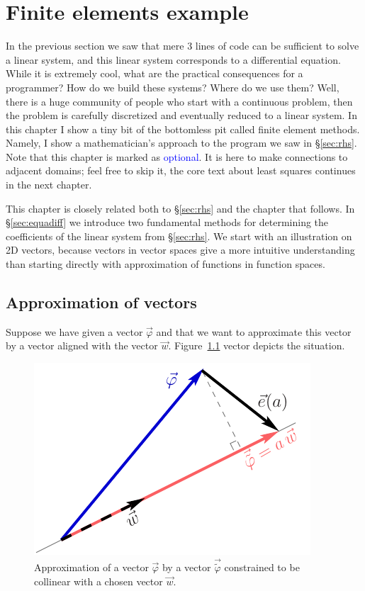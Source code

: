 \documentclass[notitlepage,oneside]{book}
\makeatletter
\newcommand{\authoredby}[1]{\addtocontents{toc}{\protect\@nameuse{authoredby#1}}}%
\makeatother
\begin{document}


\authoredby{A}
\chapter{Finite elements example}
\fancyhead[R]{\textcolor{blue}{optional for reading}}

In the previous section we saw that mere 3 lines of code can be sufficient to solve a linear system, and this linear system corresponds to a differential equation.
While it is extremely cool, what are the practical consequences for a programmer?  How do we build these systems? Where do we use them?
Well, there is a huge community of people who start with a continuous problem, then the problem is carefully discretized and eventually reduced to a linear system.
In this chapter I show a tiny bit of the bottomless pit called finite element methods.
Namely, I show a mathematician's approach to the program we saw in \S\ref{sec:rhs}.
Note that this chapter is marked as \textcolor{blue}{optional}.
It is here to make connections to adjacent domains; feel free to skip it, the core text about least squares continues in the next chapter.

This chapter is closely related both to \S\ref{sec:rhs} and the chapter that follows.
In \S\ref{sec:equadiff} we introduce two fundamental methods for determining the coefficients of the linear system from \S\ref{sec:rhs}.
We start with an illustration on 2D vectors, because vectors in vector spaces give a more intuitive understanding than starting directly with approximation of functions in function spaces.

\section{Approximation of vectors}

Suppose we have given a vector $\vec{\varphi}$ and that we want to approximate this vector by a vector aligned with the vector $\vec{w}$.
Figure~\ref{fig:vector_approximation} vector depicts the situation.

\begin{figure}[ht]
	\centering
	\includegraphics[width=.4\linewidth]{img/vector_approximation.pdf}
	\caption{Approximation of a vector $\vec{\varphi}$ by a vector $\vec{\tilde{\varphi}}$ constrained to be collinear with a chosen vector $\vec{w}$.}
	\label{fig:vector_approximation}
\end{figure}
\end{document}

